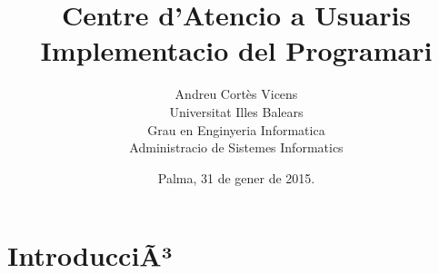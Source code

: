 \documentclass[10pt,a4paper]{article}
\author{Andreu Cortès Vicens
\\ \small{Universitat Illes Balears}
\\ \small{Grau en Enginyeria Informatica}
\\ \small{Administracio de Sistemes Informatics}}
\title{Centre d'Atencio a Usuaris
\\ \small{Implementacio del Programari}}
\date{Palma, 31 de gener de 2015.}
\begin{document}
\maketitle
\thispagestyle{empty}
\newpage
\tableofcontents
\newpage
\section{IntroducciÃ³}
\end{document}
